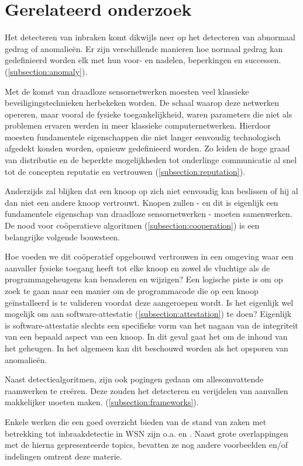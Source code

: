 \section{Gerelateerd onderzoek}
\label{section:related}

Het detecteren van inbraken komt dikwijls neer op het detecteren van abnormaal
gedrag of anomalie\"en. Er zijn verschillende manieren hoe normaal gedrag kan
gedefinieerd worden elk met hun voor- en nadelen, beperkingen en successen.
(\ref{subsection:anomaly}).

Met de komst van draadloze sensornetwerken moesten veel klassieke
beveiligingstechnieken herbekeken worden. De schaal waarop deze netwerken
opereren, maar vooral de fysieke toegankelijkheid, waren parameters die niet
als problemen ervaren werden in meer klassieke computernetwerken. Hierdoor
moesten fundamentele eigenschappen die niet langer eenvoudig technologisch
afgedekt konden worden, opnieuw gedefinieerd worden. Zo leiden de hoge graad
van distributie en de beperkte mogelijkheden tot onderlinge communicatie al
snel tot de concepten reputatie en vertrouwen (\ref{subsection:reputation}).

Anderzijds zal blijken dat een knoop op zich niet eenvoudig kan beslissen of
hij al dan niet een andere knoop vertrouwt. Knopen zullen - en dit is eigenlijk
een fundamentele eigenschap van draadloze sensornetwerken - moeten samenwerken.
De nood voor co\"operatieve algoritmen (\ref{subsection:cooperation}) is een
belangrijke volgende bouwsteen.

Hoe voeden we dit co\"operatief opgebouwd vertrouwen in een omgeving waar een
aanvaller fysieke toegang heeft tot elke knoop en zowel de vluchtige als de
programmageheugens kan benaderen en wijzigen? Een logische piste is om op zoek
te gaan naar een manier om de programmacode die op een knoop ge\"installeerd is
te valideren voordat deze aangeroepen wordt. Is het eigenlijk wel mogelijk om
aan software-attestatie (\ref{subsection:attestation}) te doen? Eigenlijk is
software-attestatie slechts een specifieke vorm van het nagaan van de
integriteit van een bepaald aspect van een knoop. In dit geval gaat het om de
inhoud van het geheugen. In het algemeen kan dit beschouwd worden als het
opsporen van anomalie\"en.

Naast detectiealgoritmen, zijn ook pogingen gedaan om allesomvattende
raamwerken te cre\"eren. Deze zouden het detecteren en verijdelen van aanvallen
makkelijker moeten maken. (\ref{subsection:frameworks}).

Enkele werken die een goed overzicht bieden van de stand van zaken met
betrekking tot inbraakdetectie in WSN zijn o.a. \citep{mishra2004intrusion} en
\citep{alrajeh2013intrusion}. Naast grote overlappingen met de hierna
gepresenteerde topics, bevatten ze nog andere voorbeelden en/of indelingen
omtrent deze materie.






